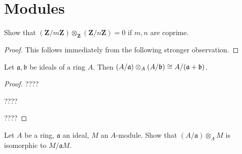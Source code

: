\chapter{Modules}
\label{ch:2}

\begin{exercise}
\label{ex:2.1}
Show that $(\mathbf Z / m\mathbf Z) \otimes_{\mathbf Z} (\mathbf Z/n\mathbf Z) = 0$ if $m,n$ are coprime.
\end{exercise}

\begin{proof}
This follows immediately from the following stronger observation.
\end{proof}

\begin{claim}
Let $\mathfrak a, \mathfrak b$ be ideals of a ring $A$.
Then $(A/\mathfrak a) \otimes_A (A/\mathfrak b) \cong A/(\mathfrak a + \mathfrak b)$.
\end{claim}

\begin{proof}

????

????

????

\end{proof}



\begin{exercise}
\label{ex:2.2}
Let $A$ be a ring, $\mathfrak a$ an ideal, $M$ an $A$-module.
Show that $(A/\mathfrak a) \otimes_A M$ is isomorphic to $M/\mathfrak a M$.

\end{exercise}

